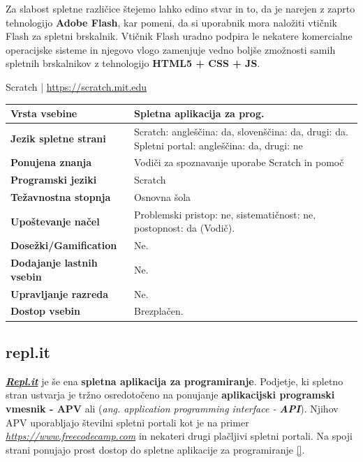 Za slabost spletne različice štejemo lahko edino stvar in to, da
je narejen z zaprto tehnologijo \textbf{Adobe Flash}, kar pomeni, da
si uporabnik mora naložiti vtičnik Flash za spletni brskalnik. Vtičnik
Flash uradno podpira le nekatere komercialne operacijske sisteme in
njegovo vlogo zamenjuje vedno boljše zmožnosti samih spletnih
brskalnikov z tehnologijo \textbf{HTML5 + CSS + JS}.

\begin{osebnabox}[label={osebna:scratch}]{Scratch | \url{https://scratch.mit.edu}}
    \begin{tabular}{
  p{} |
  p{}  }
  \textbf{Vrsta vsebine} & Spletna aplikacija za prog. \\
      \hline
  \textbf{Jezik spletne strani} & Scratch: angleščina: da, slovenščina: da,
                                  drugi: da. Spletni portal:
                                  angleščina: da, drugi: ne\\
      \hline
  \textbf{Ponujena znanja} & Vodiči za spoznavanje uporabe Scratch in pomoč \\
      \hline
 \textbf{Programski jeziki} & Scratch \\
      \hline
  \textbf{Težavnostna stopnja} & Osnovna šola \\
      \hline
   \textbf{Upoštevanje načel} & Problemski pristop: ne,
                                sistematičnost: ne, postopnost: da (Vodič). \\
      \hline
  \textbf{Dosežki/Gamification} & Ne. \\
      \hline
  \textbf{Dodajanje lastnih vsebin} & Ne. \\
      \hline
  \textbf{Upravljanje razreda} & Ne. \\
      \hline
  \textbf{Dostop vsebin} & Brezplačen. \\

\end{tabular}
\end{osebnabox}

\subsection{repl.it}
\label{sec:repl.it}

\textbf{\emph{\href{https://repl.it/}{Repl.it}}} \cite{web:replIT} je še ena
\textbf{spletna aplikacija za programiranje}. Podjetje, ki spletno
stran ustvarja je tržno osredotočeno na ponujanje \textbf{aplikacijski
  programski vmesnik - APV} ali (\emph{ang. application programming
  interface - \textbf{API}}). Njihov APV uporabljajo številni spletni
portali kot je na primer
\emph{\href{freecodecamp}{https://www.freecodecamp.com}}
\cite{web:freecodecamp} in nekateri drugi plačljivi spletni
portali. Na spoji strani ponujajo prost dostop do spletne aplikacije
za programiranje \ref{}.

